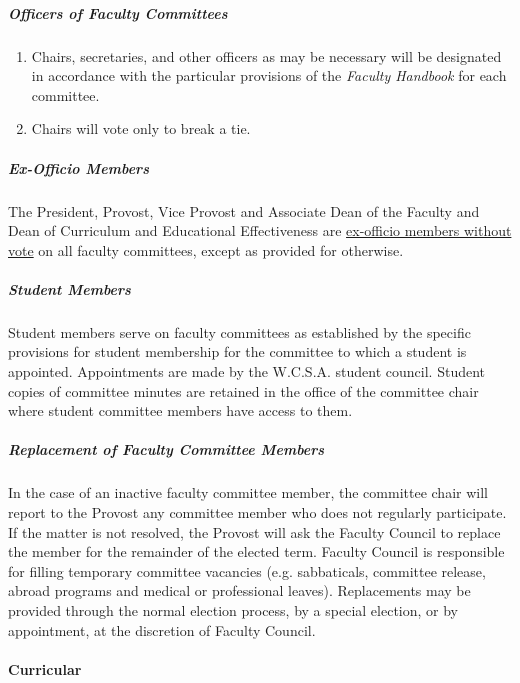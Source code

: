				\subparagraph{Officers of Faculty Committees}
					\begin{enumerate}[label=\alph*)]
						\item{Chairs, secretaries, and other officers as may be necessary will be designated in accordance with the particular provisions of the \emph{Faculty Handbook} for each committee.}
						\item{Chairs will vote only to break a tie.}
					\end{enumerate}
				\subparagraph{Ex-Officio Members}
					The President, Provost, Vice Provost and Associate Dean of the Faculty and Dean of Curriculum and Educational Effectiveness are \underline{ex-officio members without vote} on all faculty committees, except as provided for otherwise.
				\subparagraph{Student Members}
					Student members serve on faculty committees as established by the specific provisions for student membership for the committee to which a student is appointed. Appointments are made by the W.C.S.A. student council.  Student copies of committee minutes are retained in the office of the committee chair where student committee members have access to them.
				\subparagraph{Replacement of Faculty Committee Members}

					In the case of an inactive faculty committee member, the committee chair will report to the Provost any committee member who does not regularly participate.  If the matter is not resolved, the Provost will ask the Faculty Council to replace the member for the remainder of the elected term.
					Faculty Council is responsible for filling temporary committee vacancies (e.g. sabbaticals, committee release, abroad programs and medical or professional leaves).  Replacements may be provided through the normal election process, by a special election, or by appointment, at the discretion of Faculty Council.
			\paragraph{Curricular}


